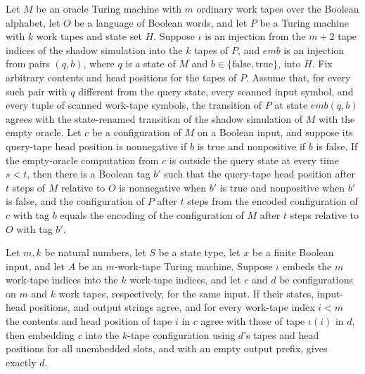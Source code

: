 \begin{theorem}
\label{Turing.oracleOffQuery}
\leanok
{}
Let $M$ be an oracle Turing machine with $m$ ordinary work tapes over the Boolean
alphabet, let $O$ be a language of Boolean words, and let $P$ be a Turing machine with
$k$ work tapes and state set $H$. Suppose $\iota$ is an injection from the $m+2$ tape
indices of the shadow simulation into the $k$ tapes of $P$, and $emb$ is an injection
from pairs $(q,b)$, where $q$ is a state of $M$ and
$b\in\{\mathrm{false},\mathrm{true}\}$, into $H$. Fix arbitrary contents and head
positions for the tapes of $P$. Assume that, for every such pair with $q$ different from
the query state, every scanned input symbol, and every tuple of scanned work-tape
symbols, the transition of $P$ at state $emb(q,b)$ agrees with the state-renamed
transition of the shadow simulation of $M$ with the empty oracle. Let $c$ be a
configuration of $M$ on a Boolean input, and suppose its query-tape head position is
nonnegative if $b$ is true and nonpositive if $b$ is false. If the empty-oracle
computation from $c$ is outside the query state at every time $s<t$, then there is a
Boolean tag $b'$ such that the query-tape head position after $t$ steps of $M$ relative
to $O$ is nonnegative when $b'$ is true and nonpositive when $b'$ is false, and the
configuration of $P$ after $t$ steps from the encoded configuration of $c$ with tag $b$
equals the encoding of the configuration of $M$ after $t$ steps relative to $O$ with tag
$b'$.
\end{theorem}

\begin{theorem}
\label{Turing.oracleBankCfg_eq}
\leanok
{}
Let $m,k$ be natural numbers, let $S$ be a state type, let $x$ be a finite Boolean
input, and let $A$ be an $m$-work-tape Turing machine. Suppose $\iota$ embeds
the $m$ work-tape indices into the $k$ work-tape indices, and let $c$ and $d$ be
configurations on $m$ and $k$ work tapes, respectively, for the same input. If their
states, input-head positions, and output strings agree, and for every work-tape index
$i<m$ the contents and head position of tape $i$ in $c$ agree with those of tape
$\iota(i)$ in $d$, then embedding $c$ into the $k$-tape configuration using $d$'s tapes
and head positions for all unembedded slots, and with an empty output prefix, gives
exactly $d$.
\end{theorem}

